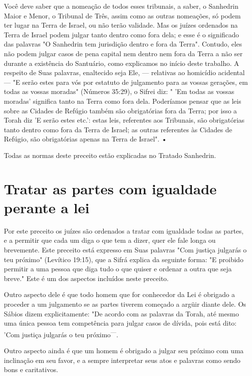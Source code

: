 \begin{itemize}
\begin{enumrate}
\begin{itemize}
\begin{itemize}
\begin{itemize}
Você deve saber que a nomeação de todos esses tribunais, a saber, o
Sanhedrin Maior e Menor, o Tribunal de Três, assim como as outras
nomea­ções, só podem ter lugar na Terra de Israel, ou não terão
validade. Mas os juízes ordenados na Terra de Israel podem julgar tanto
dentro como fora dela; e esse é o significado das palavras "O Sanhedrin
tem jurisdição dentro e fora da Ter­ra". Contudo, eles não podem julgar
casos de pena capital nem dentro nem fora da Terra a não ser durante a
existência do Santuário, como explicamos no início deste trabalho. A
respeito de Suas palavras, enaltecido seja Ele, --- relati­vas ao
homicídio acidental --- "E serão estes para vós por estatuto de
julgamen­to para as vossas gerações, em todas as vossas moradas"
(Números 35:29), o Sifrei diz: " 'Em todas as vossas moradas' significa
tanto na Terra como fora dela. Poderíamos pensar que as leis sobre as
Cidades de Refúgio também são obrigatórias fora da Terra; por isso a
Torah diz 'E serão estes etc.': estas leis, referentes aos Tribunais,
são obrigatórias tanto dentro como fora da Terra de Israel; as outras
referentes às Cidades de Refúgio, são obrigatórias apenas na Terra de
Israel". •


Todas as normas deste preceito estão explicadas no Tratado Sanhedrin.


\section{Tratar as partes com igualdade perante a lei}

Por este preceito os juízes são ordenados a tratar com igualdade to­das
as partes, e a permitir que cada um diga o que tem a dizer, quer ele
fale longa ou brevemente. Este preceito está expresso em Suas palavras
"Com justi­ça julgarás o teu próximo" (Levítico 19:15), que a Sifrá
explica da seguinte for­ma: "E proibido permitir a uma pessoa que diga
tudo o que quiser e ordenar a outra que seja breve." Este é um dos
aspectos incluídos neste preceito.

Outro aspecto dele é que todo homem que for conhecedor da Lei é obrigado
a proceder a um julgamento se as partes tiverem começado a argüir diante
dele. Os Sábios dizem explicitamente: "De acordo com as palavras da
Torah, até mesmo uma única pessoa tem competência para julgar casos de
dívi­da, pois está dito: 'Com justiça julgarás o teu
próximo\textsuperscript{---}.

Outro aspecto ainda é que um homem é obrigado a julgar seu próxi­mo com
uma inclinação em seu favor, e a sempre interpretar seus atos e
pala­vras como sendo bons e caritativos.



\end{itemize}
\end{itemize}
\end{itemize}
\end{enumrate}
\end{itemize}
